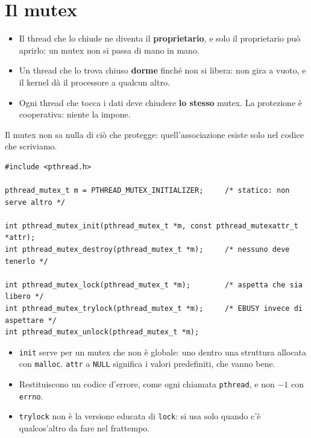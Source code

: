 \section{Il mutex}


\begin{itemize}
    \item Il thread che lo chiude ne diventa il \textbf{proprietario}, e solo il proprietario può aprirlo: un mutex non si
          passa di mano in mano.
    \item Un thread che lo trova chiuso \textbf{dorme} finché non si libera: non gira a vuoto, e il kernel dà il processore a
          qualcun altro.
    \item Ogni thread che tocca i dati deve chiudere \textbf{lo stesso} mutex. La protezione è cooperativa: niente la impone.
\end{itemize}
Il mutex non sa nulla di ciò che protegge: quell'associazione esiste solo nel codice che scriviamo.

\begin{lstlisting}[language={[POSIX]C}, style=wnumbers, title={L'API del mutex}]
#include <pthread.h>

pthread_mutex_t m = PTHREAD_MUTEX_INITIALIZER;     /* statico: non serve altro */

int pthread_mutex_init(pthread_mutex_t *m, const pthread_mutexattr_t *attr);
int pthread_mutex_destroy(pthread_mutex_t *m);     /* nessuno deve tenerlo */

int pthread_mutex_lock(pthread_mutex_t *m);        /* aspetta che sia libero */
int pthread_mutex_trylock(pthread_mutex_t *m);     /* EBUSY invece di aspettare */
int pthread_mutex_unlock(pthread_mutex_t *m);
\end{lstlisting}

\begin{itemize}
    \item \texttt{init} serve per un mutex che non è globale: uno dentro una struttura allocata con \texttt{malloc}.
          \texttt{attr} a \texttt{NULL} significa i valori predefiniti, che vanno bene.
    \item Restituiscono un codice d'errore, come ogni chiamata \texttt{pthread}, e non $-1$ con \texttt{errno}.
    \item \texttt{trylock} non è la versione educata di \texttt{lock}: si usa solo quando c'è qualcos'altro da fare nel
          frattempo.
\end{itemize}

